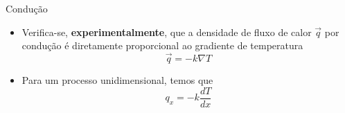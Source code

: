 \documentclass[t,%
brazilian,%
11pt,%
aspectratio=169,%
table%
]{beamer}
\begin{document}
\begin{frame}{Condução}
    \begin{itemize}
        \item Verifica-se, \textbf{experimentalmente}, que a densidade de fluxo
            de calor \(\vec{q}\) por condução é diretamente proporcional ao gradiente de
            temperatura
            \[
                \vec{q} = -k \nabla T
            \]
        \item Para um processo unidimensional, temos que
            \[
                q_x = -k \frac{dT}{dx}
            \]

    \end{itemize}
\end{frame}
\end{document}
